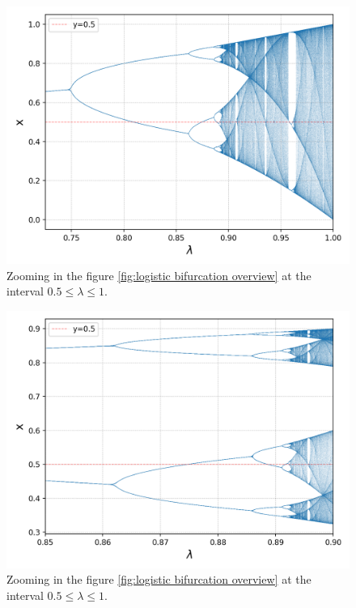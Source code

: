 \begin{figure}[htbp]
	\centering
	\label{fig:logistic_bifurcation_zoom_1}
	\includegraphics[width=\textwidth]{./figures/l_bifurcation_zoom_1.png}
	\caption{Zooming in the figure \ref{fig:logistic bifurcation overview} at the interval $0.5 \leq \lambda \leq 1$.}
\end{figure}

\begin{figure}[htbp]
	\centering
	\label{fig:logistic_bifurcation_zoom_2}
	\includegraphics[width=\textwidth]{./figures/l_bifurcation_zoom_2.png}
	\caption{Zooming in the figure \ref{fig:logistic bifurcation overview} at the interval $0.5 \leq \lambda \leq 1$.}
\end{figure}

